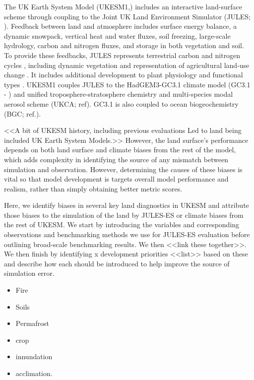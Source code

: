 \introduction  %

The UK Earth System Model (UKESM1,\cite{Sellar2019-bo}) includes an interactive land-surface scheme through coupling to the Joint UK Land Environment Simulator (JULES; \cite{best2011joint,clark2011joint}). Feedback between land and atmosphere includes surface energy balance, a dynamic snowpack, vertical heat and water fluxes, soil freezing, large-scale hydrology, carbon and nitrogen fluxes, and storage in both vegetation and soil. To provide these feedbacks, JULES represents terrestrial carbon and nitrogen cycles \citep{wiltshire2020jules}, including dynamic vegetation and representation of agricultural land-use change \citep{robertson2019local}. It includes additional development to plant physiology and functional types \citep{harper2016improved, harper2018vegetation}. UKESM1 couples JULES to the HadGEM3-GC3.1 climate model (GC3.1 - \cite{kuhlbrodt2018low, williams2018met}) and unified troposphere-stratosphere chemistry and multi-species modal aerosol scheme (UKCA; ref). GC3.1 is also coupled to ocean biogeochemistry (BGC; ref.). 


<<A bit of UKESM history, including previous evaluations Led to land being included UK Earth System Models.>> However, the land surface's performance depends on both land surface and climate biases from the rest of the model, which adds complexity in identifying the source of any mismatch between simulation and observation. However, determining the causes of these biases is vital so that model development is targets overall model performance and realism, rather than simply obtaining better metric scores.

Here, we identify biases in several key land diagnostics in UKESM and attribute those biases to the simulation of the land by JULES-ES or climate biases from the rest of UKESM. We start by introducing the variables and corresponding observations and benchmarking methods we use for JULES-ES evaluation before outlining broad-scale benchmarking results. We then <<link these together>>. We then finish by identifying x development priorities <<list>> based on these and describe how each should be introduced to help improve the source of simulation error.

\begin{itemize}
    \item Fire
    \item Soils
    \item Permafrost
    \item crop
    \item innundation
    \item acclimation.
\end{itemize}
